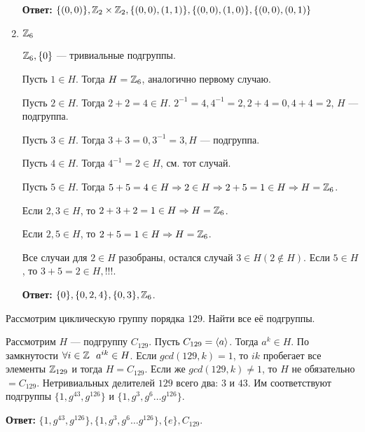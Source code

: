 \begin{solution}
\begin{enumerate}
              \textbf{Ответ:} \(\{(0, 0)\}, \mathbb{Z}_2 \times \mathbb{Z}_2, \{(0, 0), (1, 1)\}, \{(0, 0), (1, 0)\}, \{(0, 0), (0, 1)\}\)

        \item \(\mathbb{Z}_6\)

              \(\mathbb{Z}_6, \{0\}\) --- тривиальные подгруппы.


              Пусть \(1 \in H\). Тогда \(H = \mathbb{Z}_6\), аналогично первому случаю.

              Пусть \(2 \in H\). Тогда \(2 + 2 = 4 \in H\). \(2^{-1} = 4, 4^{-1} = 2, 2 + 4 = 0, 4 + 4 = 2\), \(H\) --- подгруппа.

              Пусть \(3 \in H\). Тогда \(3 + 3 = 0, 3^{-1} = 3, H\) --- подгруппа.

              Пусть \(4 \in H\). Тогда \(4^{-1} = 2 \in H\), см. тот случай.

              Пусть \(5 \in H\). Тогда \(5 + 5 = 4 \in H \Rightarrow 2 \in H \Rightarrow 2 + 5 = 1 \in H \Rightarrow H = \mathbb{Z}_6\).

              Если \(2, 3 \in H\), то \(2 + 3 + 2 = 1 \in H \Rightarrow H = \mathbb{Z}_6\).

              Если \(2, 5 \in H\), то \(2 + 5 = 1 \in H \Rightarrow H = \mathbb{Z}_6\).

              Все случаи для \(2 \in H\) разобраны, остался случай \(3 \in H (2 \notin H)\). Если \(5 \in H\), то \(3 + 5 = 2 \in H, !!!\).

              \textbf{Ответ:} \(\{0\}, \{0, 2, 4\}, \{0, 3\}, \mathbb{Z}_6\).
    \end{enumerate}
\end{solution}

\begin{exercise}
    Рассмотрим циклическую группу порядка \(129\). Найти все её подгруппы.
\end{exercise}
\begin{solution}
    Рассмотрим \(H\) --- подгруппу \(C_{129}\). Пусть \(C_{129} = \ev{a}\). Тогда \(a^k \in H\). По замкнутости \(\forall i \in \mathbb{Z} \ \ a^{ik} \in H\). Если \(gcd(129, k) = 1\), то \(ik\) пробегает все элементы \(\mathbb{Z}_{129}\) и тогда \(H = C_{129}\). Если же \(gcd(129, k) \neq 1\), то \(H\) не обязательно \( = C_{129}\). Нетривиальных делителей \(129\) всего два: \(3\) и \(43\). Им соответствуют подгруппы \(\{1, g^{43}, g^{126}\}\) и \(\{1, g^3, g^6 \dots g^{126}\}\).


    \textbf{Ответ:} \(\{1, g^{43}, g^{126}\}, \{1, g^3, g^6 \dots g^{126}\}, \{e\}, C_{129}\).
\end{solution}


